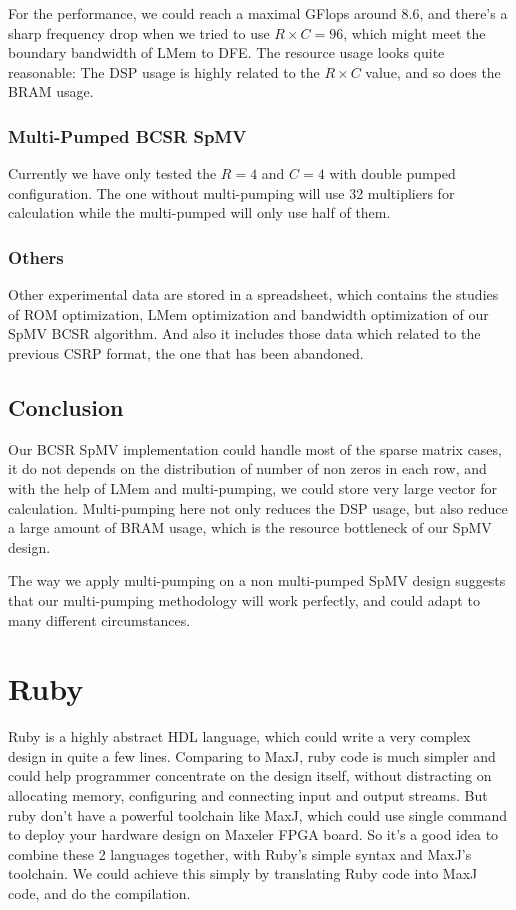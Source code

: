 \documentclass[a4paper, 10pt]{report}
\begin{document}
For the performance, we could reach a maximal GFlops around 8.6, and there's a sharp frequency drop when we tried to use $R\times C=96$, which might meet the boundary bandwidth of LMem to DFE. The resource usage looks quite reasonable: The DSP usage is highly related to the $R\times C$ value, and so does the BRAM usage.

\subsection{Multi-Pumped BCSR SpMV}

Currently we have only tested the $R=4$ and $C=4$ with double pumped configuration. The one without multi-pumping will use 32 multipliers for calculation while the multi-pumped will only use half of them. 

\subsection{Others}

Other experimental data are stored in a spreadsheet, which contains the studies of ROM optimization, LMem optimization and bandwidth optimization of our SpMV BCSR algorithm. And also it includes those data which related to the previous CSRP format, the one that has been abandoned.

\section{Conclusion}
Our BCSR SpMV implementation could handle most of the sparse matrix cases, it do not depends on the distribution of number of non zeros in each row, and with the help of LMem and multi-pumping, we could store very large vector for calculation. Multi-pumping here not only reduces the DSP usage, but also reduce a large amount of BRAM usage, which is the resource bottleneck of our SpMV design. 

The way we apply multi-pumping on a non multi-pumped SpMV design suggests that our multi-pumping methodology will work perfectly, and could adapt to many different circumstances.

\chapter{Ruby}

Ruby is a highly abstract HDL language, which could write a very complex design in quite a few lines. Comparing to MaxJ, ruby code is much simpler and could help programmer concentrate on the design itself, without distracting on allocating memory, configuring and connecting input and output streams. But ruby don't have a powerful toolchain like MaxJ, which could use single command to deploy your hardware design on Maxeler FPGA board. So it's a good idea to combine these 2 languages together, with Ruby's simple syntax and MaxJ's toolchain. We could achieve this simply by translating Ruby code into MaxJ code, and do the compilation.
\end{document}
